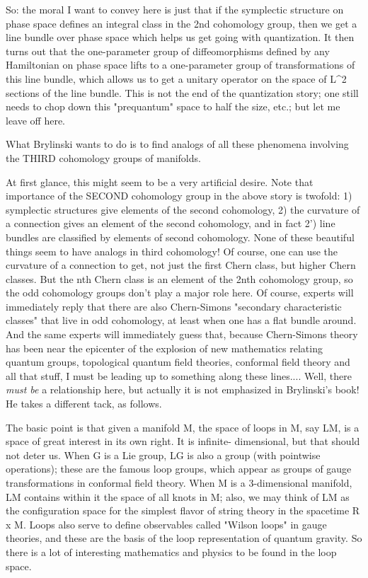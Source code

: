 So: the moral I want to convey here is just that if the symplectic
structure on phase space defines an integral class in the 2nd cohomology
group, then we get a line bundle over phase space which helps us get 
going with quantization.   It then turns out that the one-parameter
group of diffeomorphisms defined by any Hamiltonian on phase space lifts
to a one-parameter group of transformations of this line bundle, which
allows us to get a unitary operator on the space of L^2 sections of the
line bundle.  This is not the end of the quantization story; one still
needs to chop down this "prequantum" space to half the size, etc.; but
let me leave off here.

What Brylinski wants to do is to find analogs of all these phenomena
involving the THIRD cohomology groups of manifolds.

At first glance, this might seem to be a very artificial desire.  Note
that importance of the SECOND cohomology group in the above story is
twofold: 1) symplectic structures give elements of the second
cohomology, 2) the curvature of a connection gives an element of the
second cohomology, and in fact 2') line bundles are classified by
elements of second cohomology.  None of these beautiful things seem to
have analogs in third cohomology!  Of course, one can use the curvature
of a connection to get, not just the first Chern class, but higher Chern
classes.  But the nth Chern class is an element of the 2nth cohomology
group, so the odd cohomology groups don't play a major role here.  Of
course, experts will immediately reply that there are also Chern-Simons
"secondary characteristic classes" that live in odd cohomology, at least
when one has a flat bundle around.  And the same experts will
immediately guess that, because Chern-Simons theory has been near the
epicenter of the explosion of new mathematics relating quantum groups,
topological quantum field theories, conformal field theory and all that
stuff, I must be leading up to something along these lines....  Well,
there \emph{must be} a relationship here, but actually it is not emphasized
in Brylinski's book!  He takes a different tack, as follows.

The basic point is that given a manifold M, the space of loops in M, say
LM, is a space of great interest in its own right.  It is infinite-
dimensional, but that should not deter us.  When G is a Lie group, LG is
also a group (with pointwise operations); these are the famous loop
groups, which appear as groups of gauge transformations in conformal
field theory.  When M is a 3-dimensional manifold, LM contains within it
the space of all knots in M; also, we may think of LM as the
configuration space for the simplest flavor of string theory in the
spacetime R x M.  Loops also serve to define observables called "Wilson
loops" in gauge theories, and these are the basis of the loop
representation of quantum gravity.  So there is a lot of interesting
mathematics and physics to be found in the loop space.

